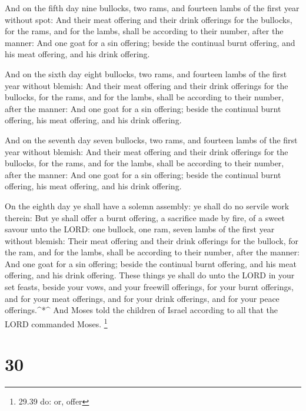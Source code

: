  And on the fifth day nine bullocks, two rams, and fourteen
lambs of the first year without spot:  And their meat
offering and their drink offerings for the bullocks, for the rams, and
for the lambs, shall be according to their number, after the manner:
 And one goat for a sin offering; beside the continual
burnt offering, and his meat offering, and his drink offering.

 And on the sixth day eight bullocks, two rams, and
fourteen lambs of the first year without blemish:  And
their meat offering and their drink offerings for the bullocks, for the
rams, and for the lambs, shall be according to their number, after the
manner:  And one goat for a sin offering; beside the
continual burnt offering, his meat offering, and his drink offering.

 And on the seventh day seven bullocks, two rams, and
fourteen lambs of the first year without blemish:  And
their meat offering and their drink offerings for the bullocks, for the
rams, and for the lambs, shall be according to their number, after the
manner:  And one goat for a sin offering; beside the
continual burnt offering, his meat offering, and his drink offering.

 On the eighth day ye shall have a solemn assembly: ye
shall do no servile work therein:  But ye shall offer a
burnt offering, a sacrifice made by fire, of a sweet savour unto the
LORD: one bullock, one ram, seven lambs of the first year without
blemish:  Their meat offering and their drink offerings for
the bullock, for the ram, and for the lambs, shall be according to their
number, after the manner:  And one goat for a sin offering;
beside the continual burnt offering, and his meat offering, and his
drink offering.  These things ye shall do unto the LORD in
your set feasts, beside your vows, and your freewill offerings, for your
burnt offerings, and for your meat offerings, and for your drink
offerings, and for your peace offerings.\^{}*\^{}  And
Moses told the children of Israel according to all that the LORD
commanded Moses. \footnote{29.39 do: or, offer}

\hypertarget{section-29}{%
\section{30}\label{section-29}}

